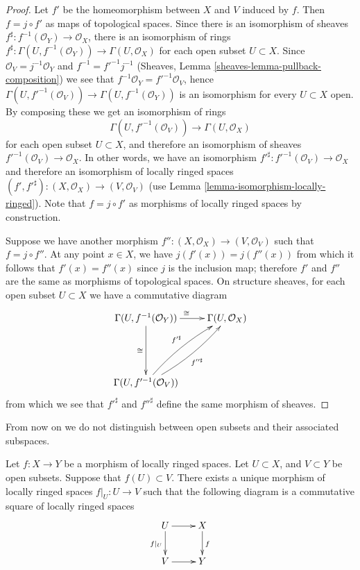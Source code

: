 \begin{proof}
Let $f'$ be the homeomorphism between $X$ and $V$ induced by $f$. Then
$f = j \circ f'$ as maps of topological spaces. Since there
is an isomorphism of sheaves
$f^\sharp : f^{-1}(\mathcal{O}_Y) \to \mathcal{O}_X$, there is an isomorphism
of rings
$f^\sharp : \Gamma(U, f^{-1}(\mathcal{O}_Y)) \to \Gamma(U, \mathcal{O}_X)$
for each open subset $U \subset X$. Since
$\mathcal{O}_V = j^{-1}\mathcal{O}_Y$ and $f^{-1} = f'^{-1} j^{-1}$
(Sheaves, Lemma \ref{sheaves-lemma-pullback-composition}) we
see that $f^{-1}\mathcal{O}_Y = f'^{-1}\mathcal{O}_V$, hence
$\Gamma(U, f'^{-1}(\mathcal{O}_V)) \to \Gamma(U, f^{-1}(\mathcal{O}_Y))$
is an isomorphism
for every $U \subset X$ open. By composing these we get an isomorphism of rings
$$
\Gamma(U, f'^{-1}(\mathcal{O}_V)) \to \Gamma(U, \mathcal{O}_X)
$$
for each open subset $U \subset X$, and therefore an isomorphism of sheaves
$f'^{-1}(\mathcal{O}_V) \to \mathcal{O}_X$. In other words, we have an
isomorphism $f'^{\sharp} : f'^{-1}(\mathcal{O}_V) \to \mathcal{O}_X$ and
therefore an isomorphism of locally ringed spaces
$(f', f'^{\sharp}) : (X, \mathcal{O}_X) \to (V, \mathcal{O}_V)$
(use Lemma \ref{lemma-isomorphism-locally-ringed}).
Note that $f = j \circ f'$ as morphisms of locally ringed spaces
by construction.

\medskip\noindent
Suppose we have another morphism
$f'' : (X, \mathcal{O}_X) \to (V, \mathcal{O}_V)$ such that $f = j \circ f''$.
At any point $x \in X$, we have $j(f'(x)) = j(f''(x))$ from which it follows
that $f'(x) = f''(x)$ since $j$ is the inclusion map; therefore $f'$ and $f''$
are the same as morphisms of topological spaces. On structure sheaves,
for each open subset $U \subset X$ we have a commutative diagram
$$
\xymatrix @R=5em{
\Gamma(U, f^{-1}(\mathcal{O}_Y)) \ar[d]_\cong\ar[r]^\cong &
\Gamma(U, \mathcal{O}_X) \\
\Gamma(U, f'^{-1}(\mathcal{O}_V)) \ar@/^/[ru]^{f'^\sharp}
\ar@/_/[ru]_{f''^\sharp} &
}
$$
from which we see that $f'^\sharp$ and $f''^\sharp$ define
the same morphism of sheaves.
\end{proof}

\noindent
From now on we do not distinguish between open subsets
and their associated subspaces.

\begin{lemma}
\label{lemma-restrict-map-to-opens}
Let $f : X \to Y$ be a morphism of locally ringed spaces.
Let $U \subset X$, and $V \subset Y$ be open subsets.
Suppose that $f(U) \subset V$. There exists a unique
morphism of locally ringed spaces $f|_U : U \to V$ such
that the following diagram is a commutative square of
locally ringed spaces
$$
\xymatrix{
U \ar[d]_{f|_U} \ar[r] & X \ar[d]^f \\
V \ar[r] & Y
}
$$
\end{lemma}


